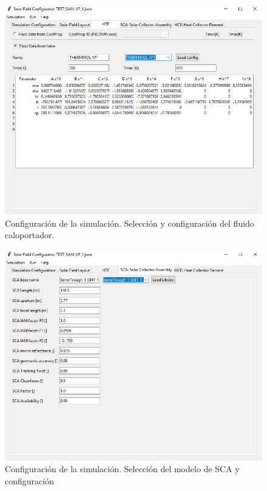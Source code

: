 \begin{figure}
\includegraphics[scale=0.8]{images/interface03.png}
\caption{Configuración de la simulación. Selección y configuración del fluido caloportador.} 
\label{fig:interface03}
\end{figure}

\begin{figure}
\includegraphics[scale=0.8]{images/interface04.png}
\caption{Configuración de la simulación. Selección del modelo de SCA y configuración} 
\label{fig:interface04}
\end{figure}


